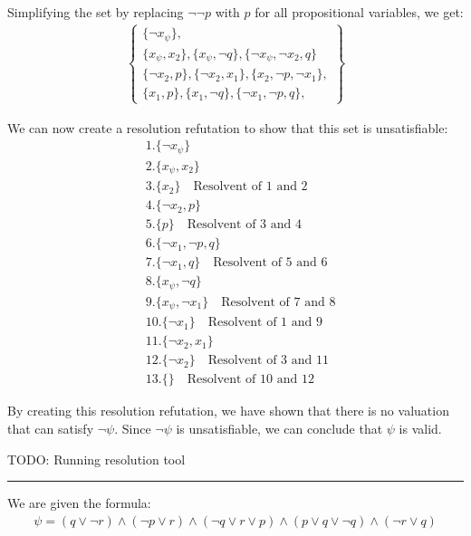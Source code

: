 \documentclass[12pt,letterpaper, onecolumn]{exam}
\begin{document}
\begin{questions}
	Simplifying the set by replacing $ \neg \neg p $ with $ p $ for all propositional variables, we get:
	\begin{align*}
		\left .
			\begin{cases}
				\{ \neg x_{\psi} \}, \\
				\{ x_{\psi}, x_2 \}, \{ x_{\psi}, \neg q \}, \{ \neg x_{\psi}, \neg x_2, q \} \\
				\{ \neg x_2, p \}, \{ \neg x_2, x_1 \}, \{ x_2, \neg p, \neg x_1  \}, \\
				\{ x_1, p \}, \{ x_1, \neg q \}, \{ \neg x_1, \neg p, q \},
			\end{cases}
		\right\}
	\end{align*}

	We can now create a resolution refutation to show that this set is unsatisfiable:
	\begin{align*}
		& 1. \{ \neg x_{\psi} \} \\
		& 2. \{ x_{\psi}, x_2 \} \\
		& 3. \{ x_2 \} \quad \text{Resolvent of 1 and 2} \\
		& 4. \{ \neg x_2, p \} \\
		& 5. \{ p \} \quad \text{Resolvent of 3 and 4} \\
		& 6. \{ \neg x_1, \neg p, q \} \\
		& 7. \{ \neg x_1, q \} \quad \text{Resolvent of 5 and 6} \\
		& 8. \{ x_{\psi}, \neg q \} \\ 
		& 9. \{ x_{\psi}, \neg x_1 \} \quad \text{Resolvent of 7 and 8} \\
		& 10. \{ \neg x_1 \} \quad \text{Resolvent of 1 and 9} \\
		& 11. \{ \neg x_2, x_1 \} \\
		& 12. \{ \neg x_2 \} \quad \text{Resolvent of 3 and 11} \\
		& 13. \{  \} \quad \text{Resolvent of 10 and 12}
	\end{align*}

	By creating this resolution refutation, we have shown that there is no valuation that can satisfy $ \neg \psi $.
	Since $ \neg \psi $ is unsatisfiable, we can conclude that $ \psi $ is valid.

	TODO: Running resolution tool

    {\rule{17cm}{0.4pt}}
	\question[]
	\solutiontitle

	We are given the formula:
	\begin{align*}
		\psi = (q \lor \neg r) \land (\neg p \lor r) \land (\neg q \lor r \lor p) \land (p \lor q \lor \neg q) \land (\neg r \lor q)
	\end{align*}


\end{questions}
\end{document}
